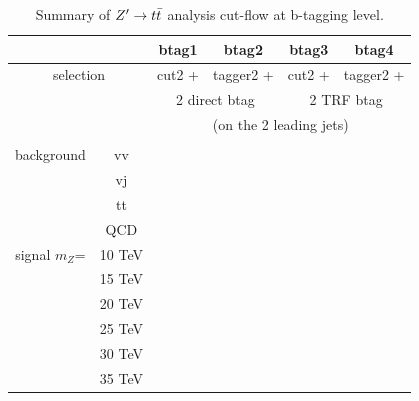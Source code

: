 \documentclass{cernrep}
\begin{document}
\begin{landscape}
\begin{table}[!htb]\centering
\begin{tabular}{|c|c|c|c|c|c|}
\hline
\hline
\multicolumn{2}{|c|}{}          & btag1 & btag2                      & btag3 & btag4                   \\
\hline
\multicolumn{2}{|c|}{selection} & cut2 + & tagger2 +                 & cut2 + & tagger2 +              \\
\multicolumn{2}{|c|}{}          & \multicolumn{2}{c|}{2 direct btag} & \multicolumn{2}{c|}{2 TRF btag} \\
\multicolumn{2}{|c|}{}          & \multicolumn{4}{c|}{(on the 2 leading jets)}                         \\
\multicolumn{2}{|c|}{}          & \multicolumn{4}{c|}{}                                                \\
\hline
\hline
background      & vv            &  &  &  &  \\
                & vj            &  &  &  &  \\
                & tt            &  &  &  &  \\
                & QCD           &  &  &  &  \\
\hline
signal $m_{Z}$= & 10 TeV        &  &  &  &  \\
                & 15 TeV        &  &  &  &  \\
                & 20 TeV        &  &  &  &  \\
                & 25 TeV        &  &  &  &  \\
                & 30 TeV        &  &  &  &  \\
                & 35 TeV        &  &  &  &  \\

\hline
\hline
\end{tabular}
\caption{Summary of $Z^{\prime} \rightarrow t\bar{t}$ analysis cut-flow at b-tagging level.}
\label{tab:Zptt_cutflow_btag}
\end{table}
\end{landscape}
\end{document}
